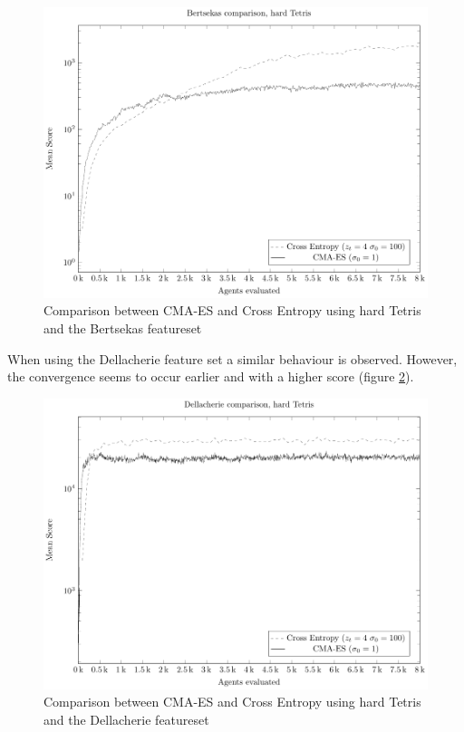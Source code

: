 \begin{figure}[H]
\includegraphics[scale=1]{plots/plotBertsekasCmaVsCEHardTetris}
\caption{Comparison between CMA-ES and Cross Entropy 
using hard Tetris and the Bertsekas featureset 
\label{fig:featuresetCompareBertsekas}}
\end{figure}

When using the Dellacherie feature set a similar behaviour is observed.
However, the convergence seems to occur earlier and with a higher score
(figure \ref{fig:featuresetCompareDellacherie}).

\begin{figure}[H]
\includegraphics[scale=1]{plots/plotDellCmaVsCEHardTetris}
\caption{Comparison between CMA-ES and Cross Entropy 
using hard Tetris and the Dellacherie featureset
\label{fig:featuresetCompareDellacherie}}
\end{figure}

